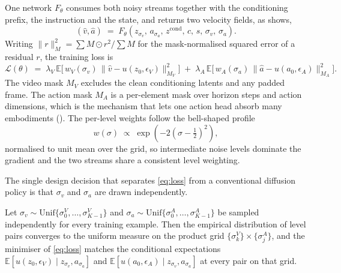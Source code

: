 One network $F_\theta$ consumes both noisy streams together with the
conditioning prefix, the instruction and the state, and returns two velocity
fields, as  shows,
\begin{equation}
  \left(\hat{v}, \hat{a}\right)
  \;=\;
  F_\theta\!\left(z_{\sigma_v},\, a_{\sigma_a},\, z^{\text{cond}},\, c,\, s,\, \sigma_v,\, \sigma_a\right).
  \label{eq:net}
\end{equation}
Writing $\|r\|^2_{M} = \sum M \odot r^2 \big/ \sum M$ for the mask-normalised
squared error of a residual $r$, the training loss is
\begin{equation}
  \mathcal{L}(\theta)
  \;=\;
  \lambda_V \, \mathbb{E}\Big[\, w_V(\sigma_v)\,
    \big\| \hat{v} - u(z_0, \epsilon_V) \big\|^2_{M_V} \Big]
  \;+\;
  \lambda_A \, \mathbb{E}\Big[\, w_A(\sigma_a)\,
    \big\| \hat{a} - u(a_0, \epsilon_A) \big\|^2_{M_A} \Big].
  \label{eq:loss}
\end{equation}
The video mask $M_V$ excludes the clean conditioning latents and any padded
frame. The action mask $M_A$ is a per-element mask over horizon steps and action
dimensions, which is the mechanism that lets one action head absorb many
embodiments (). The per-level weights follow the
bell-shaped profile
\begin{equation}
  w(\sigma) \;\propto\; \exp\!\left(-2\left(\sigma - \tfrac{1}{2}\right)^{2}\right),
  \label{eq:weight}
\end{equation}
normalised to unit mean over the grid, so intermediate noise levels dominate the
gradient and the two streams share a consistent level weighting.

The single design decision that separates \eqref{eq:loss} from a conventional
diffusion policy is that $\sigma_v$ and $\sigma_a$ are drawn independently.

\begin{proposition}
\label{prop:product}
Let $\sigma_v \sim \mathrm{Unif}\{\sigma^V_0, \dots, \sigma^V_{K-1}\}$ and
$\sigma_a \sim \mathrm{Unif}\{\sigma^A_0, \dots, \sigma^A_{K-1}\}$ be sampled
independently for every training example. Then the empirical distribution of
level pairs converges to the uniform measure on the product grid
$\{\sigma^V_k\} \times \{\sigma^A_j\}$, and the minimiser of \eqref{eq:loss}
matches the conditional expectations
$\mathbb{E}[u(z_0,\epsilon_V) \mid z_{\sigma_v}, a_{\sigma_a}]$ and
$\mathbb{E}[u(a_0,\epsilon_A) \mid z_{\sigma_v}, a_{\sigma_a}]$ at every pair on
that grid.
\end{proposition}

